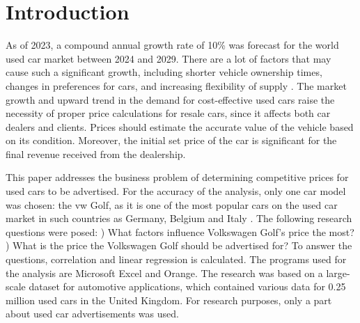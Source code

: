\chapter{Introduction}
As of 2023, a compound annual growth rate of 10\% was forecast for the world used car market between 2024 and 2029. There are a lot of factors that may cause such a significant growth, including shorter vehicle ownership times, changes in preferences for cars, and increasing flexibility of supply
\autocite{UsedCarMarket}.
The market growth and upward trend in the demand for cost-effective used cars 
\autocite{EuropeUsedCar} 
raise the necessity of proper price calculations for resale cars, since it affects both car dealers and clients. Prices should estimate the accurate value of the vehicle based on its condition. Moreover, the initial set price of the car is significant for the final revenue received from the dealership.
 
This paper addresses the business problem of determining competitive prices for used cars to be advertised. For the accuracy of the analysis, only one car model was chosen: the \ac{vw} Golf, as it is one of the most popular cars on the used car market in such countries as Germany, Belgium and Italy 
\autocite{misselhornDevelopmentUsedCar2024}.
The following research questions were posed: 
) What factors influence Volkswagen Golf's price the most? ) What is the price the Volkswagen Golf should be advertised for? \newline
To answer the questions, correlation and linear regression is calculated. The programs used for the analysis are Microsoft Excel and Orange.
The research was based on a large-scale dataset for automotive applications, which contained various data for 0.25 million used cars in the United Kingdom. For research purposes, only a part about used car advertisements was used.


